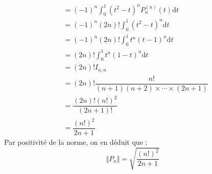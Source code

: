 \documentclass[a4paper,twoside,french,11pt]{VcCours}
\newcommand{\dt}{\text{d}t}
\begin{document}
\begin{enumerate}
\begin{align*}
& = (-1)^n \int_{0}^1 (t^2-t)^n P_n^{(n)}(t) \dt \\
& = (-1)^n (2n)! \int_{0}^1 (t^2-t)^n  \dt \\
& = (-1)^n (2n)! \int_{0}^1t^n(t-1)^n  \dt \\
& = (2n)! \int_{0}^1t^n(1-t)^n  \dt \\
& = (2n)! I_{n,n} \\
& =(2n)! \dfrac{n!}{(n+1)(n+2) \times \cdots \times (2n+1)} \\
& = \dfrac{(2n)!(n!)^2}{(2n+1)!} \\
& = \dfrac{(n!)^2}{2n+1}
\end{align*}
Par positivité de la norme, on en déduit que :
$$ \Vert P_n \Vert = \sqrt{\dfrac{(n!)^2}{2n+1}}$$
\end{enumerate}







 
 
\end{document}
